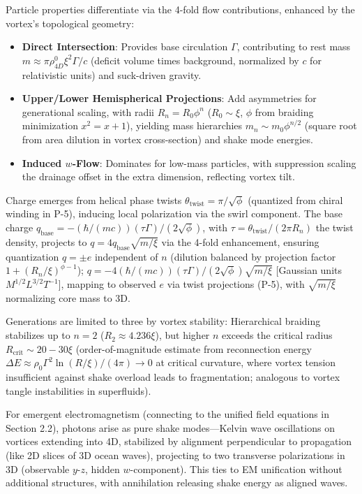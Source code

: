 Particle properties differentiate via the 4-fold flow contributions, enhanced by the vortex's topological geometry:
\begin{itemize}
\item \textbf{Direct Intersection}: Provides base circulation $\Gamma$, contributing to rest mass $m \approx \pi \rho_{4D}^0 \xi^2 \Gamma / c$ (deficit volume times background, normalized by $c$ for relativistic units) and suck-driven gravity.
\item \textbf{Upper/Lower Hemispherical Projections}: Add asymmetries for generational scaling, with radii $R_n = R_0 \phi^n$ ($R_0 \sim \xi$, $\phi$ from braiding minimization $x^2 = x + 1$), yielding mass hierarchies $m_n \sim m_0 \phi^{n/2}$ (square root from area dilution in vortex cross-section) and shake mode energies.
\item \textbf{Induced $w$-Flow}: Dominates for low-mass particles, with suppression scaling the drainage offset in the extra dimension, reflecting vortex tilt.
\end{itemize}

Charge emerges from helical phase twists $\theta_{\text{twist}} = \pi / \sqrt{\phi}$ (quantized from chiral winding in P-5), inducing local polarization via the swirl component. The base charge $q_{\text{base}} = - (\hbar / (m c)) (\tau \Gamma) / (2 \sqrt{\phi})$, with $\tau = \theta_{\text{twist}} / (2 \pi R_n)$ the twist density, projects to $q = 4 q_{\text{base}} \sqrt{m / \xi}$ via the 4-fold enhancement, ensuring quantization $q = \pm e$ independent of $n$ (dilution balanced by projection factor $1 + (R_n / \xi)^{\phi - 1}$); $q = -4 (\hbar / (m c)) (\tau \Gamma) / (2 \sqrt{\phi}) \sqrt{m / \xi}$ [Gaussian units $M^{1/2} L^{3/2} T^{-1}$], mapping to observed $e$ via twist projections (P-5), with $\sqrt{m / \xi}$ normalizing core mass to 3D.

Generations are limited to three by vortex stability: Hierarchical braiding stabilizes up to $n=2$ ($R_2 \approx 4.236 \xi$), but higher $n$ exceeds the critical radius $R_{\text{crit}} \sim 20-30 \xi$ (order-of-magnitude estimate from reconnection energy $\Delta E \approx \rho_0 \Gamma^2 \ln(R / \xi) / (4\pi) \to 0$ at critical curvature, where vortex tension insufficient against shake overload leads to fragmentation; analogous to vortex tangle instabilities in superfluids).

For emergent electromagnetism (connecting to the unified field equations in Section 2.2), photons arise as pure shake modes---Kelvin wave oscillations on vortices extending into 4D, stabilized by alignment perpendicular to propagation (like 2D slices of 3D ocean waves), projecting to two transverse polarizations in 3D (observable $y$-$z$, hidden $w$-component). This ties to EM unification without additional structures, with annihilation releasing shake energy as aligned waves.

